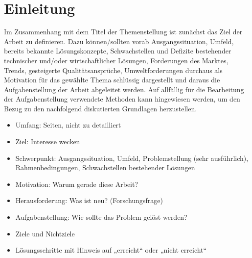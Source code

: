 \chapter{Einleitung}
\label{sec: Einleitung}

Im Zusammenhang mit dem Titel der Themenstellung ist zunächst das Ziel der Arbeit zu definieren. Dazu können/sollten vorab Ausgangssituation, Umfeld, bereits bekannte Lösungskonzepte, Schwachstellen und Defizite bestehender technischer und/oder wirtschaftlicher Lösungen, Forderungen des Marktes, Trends, gesteigerte Qualitätsansprüche, Umweltforderungen \usw durchaus als Motivation für das gewählte Thema schlüssig dargestellt und daraus die Aufgabenstellung der Arbeit abgeleitet werden. Auf allfällig für die Bearbeitung der Aufgabenstellung verwendete Methoden kann hingewiesen werden, um den Bezug zu den nachfolgend diskutierten Grundlagen herzustellen.
\begin{itemize}
	\item Umfang:  Seiten, nicht zu detailliert
	\item Ziel: Interesse wecken
	\item Schwerpunkt: Ausgangssituation, Umfeld, Problemstellung (sehr ausführlich), Rahmenbedingungen, Schwachstellen bestehender Lösungen
	\item Motivation: Warum gerade diese Arbeit?
	\item Herausforderung: Was ist neu? (Forschungsfrage)
	\item Aufgabenstellung: Wie sollte das Problem gelöst werden?
	\item Ziele und Nichtziele
	\item Lösungsschritte mit Hinweis auf „erreicht“ oder „nicht erreicht“
\end{itemize}